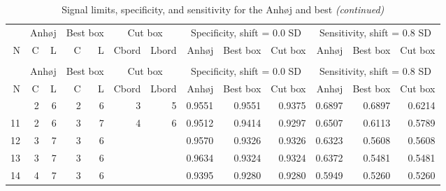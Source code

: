\begin{Schunk}

\begin{longtable}{rrrrrrrrrrrrr}
\caption{\label{tab:tab1}Signal limits, specificity, and sensitivity for the Anhøj and best box
        rules and borders for the cut box rules. N = number of data points in
        chart.
        C = lower limit for number of crossings, L = upper limit for longest 
        run,  for declaring random variation by the Anhøj and best box rules. 
        Cbord and Lbord = Additional information for the cut box rules. When
        specified, parts of the border of the best box to retain to declare
        random variation. When not specified, cut box is identical to best box.}\\
\toprule
\multicolumn{1}{c}{ } & \multicolumn{2}{c}{Anhøj} & \multicolumn{2}{c}{Best box} & \multicolumn{2}{c}{Cut box} & \multicolumn{3}{c}{Specificity, shift = 0.0 SD} & \multicolumn{3}{c}{Sensitivity, shift = 0.8 SD} \\
\cmidrule(l{3pt}r{3pt}){2-3} \cmidrule(l{3pt}r{3pt}){4-5} \cmidrule(l{3pt}r{3pt}){6-7} \cmidrule(l{3pt}r{3pt}){8-10} \cmidrule(l{3pt}r{3pt}){11-13}
N & C & L & C & L & Cbord & Lbord & Anhøj & Best box & Cut box & Anhøj & Best box & Cut box\\
\midrule
\endfirsthead
\caption[]{Signal limits, specificity, and sensitivity for the Anhøj and best  \textit{(continued)}}\\
\toprule
\multicolumn{1}{c}{ } & \multicolumn{2}{c}{Anhøj} & \multicolumn{2}{c}{Best box} & \multicolumn{2}{c}{Cut box} & \multicolumn{3}{c}{Specificity, shift = 0.0 SD} & \multicolumn{3}{c}{Sensitivity, shift = 0.8 SD} \\
\cmidrule(l{3pt}r{3pt}){2-3} \cmidrule(l{3pt}r{3pt}){4-5} \cmidrule(l{3pt}r{3pt}){6-7} \cmidrule(l{3pt}r{3pt}){8-10} \cmidrule(l{3pt}r{3pt}){11-13}
N & C & L & C & L & Cbord & Lbord & Anhøj & Best box & Cut box & Anhøj & Best box & Cut box\\
\midrule
\endhead
\
\endfoot
\bottomrule
\endlastfoot
10 & 2 & 6 & 2 & 6 & 3 & 5 & 0.9551 & 0.9551 & 0.9375 & 0.6897 & 0.6897 & 0.6214\\
11 & 2 & 6 & 3 & 7 & 4 & 6 & 0.9512 & 0.9414 & 0.9297 & 0.6507 & 0.6113 & 0.5789\\
12 & 3 & 7 & 3 & 6 &  &  & 0.9570 & 0.9326 & 0.9326 & 0.6323 & 0.5608 & 0.5608\\
13 & 3 & 7 & 3 & 6 &  &  & 0.9634 & 0.9324 & 0.9324 & 0.6372 & 0.5481 & 0.5481\\
14 & 4 & 7 & 3 & 6 &  &  & 0.9395 & 0.9280 & 0.9280 & 0.5949 & 0.5260 & 0.5260\\

\end{longtable}
\end{Schunk}
